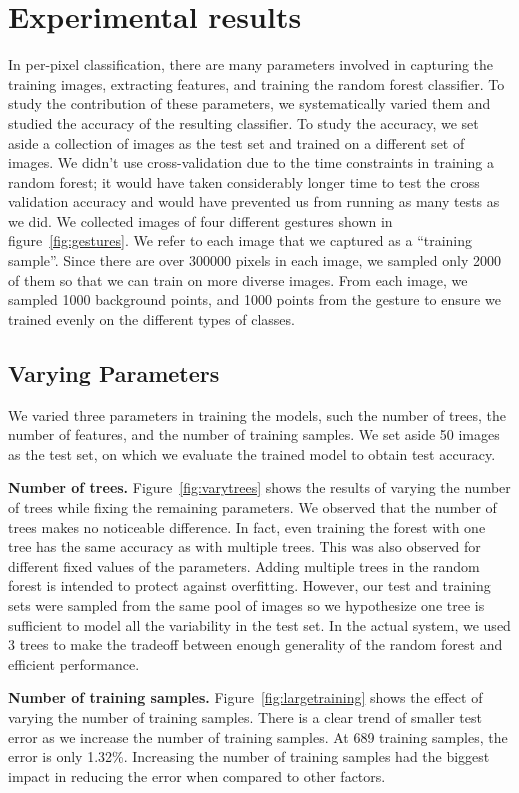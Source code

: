 \section{Experimental results}
In per-pixel classification, there are many parameters involved in capturing the training images, extracting features, and training the random forest classifier. To study the contribution of these parameters, we systematically varied them and studied the accuracy of the resulting classifier. To study the accuracy, we set aside a collection of images as the test set and trained on a different set of images. We didn't use cross-validation due to the time constraints in training a random forest; it would have taken considerably longer time to test the cross validation accuracy and would  have prevented us from running as many tests as we did.
We collected images of four different gestures shown in figure~\ref{fig:gestures}. We refer to each image that we captured as a ``training sample''. Since there are over 300000 pixels in each image, we sampled only 2000 of them so that we can train on more diverse images. From each image, we sampled 1000 background points, and 1000 points from the gesture to ensure we trained evenly on the different types of classes.
\subsection{Varying Parameters} 
We varied three parameters in training the models, such the number of trees, the number of features, and the number of training samples. We set aside 50 images as the test set, on which we evaluate the trained model to obtain test accuracy. 

\textbf{Number of trees.} Figure~\ref{fig:varytrees} shows the results of varying the number of trees while fixing the remaining parameters. We observed that the number of trees makes no noticeable difference. In fact, even training the forest with one tree has the same accuracy as with multiple trees. This was also observed for different fixed values of the parameters. Adding multiple trees in the random forest is intended to protect against overfitting. However, our test and training sets were sampled from the same pool of images so we hypothesize one tree is sufficient to model all the variability in the test set. In the actual system, we used 3 trees to make the tradeoff between enough generality of the random forest and efficient performance. 

\textbf{Number of training samples.} Figure~\ref{fig:largetraining} shows the effect of varying the number of training samples. There is a clear trend of smaller test error as we increase the number of training samples. At 689 training samples, the error is only 1.32\%. Increasing the number of training samples had the biggest impact in reducing the error when compared to other factors. 

